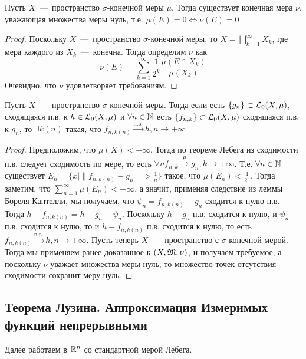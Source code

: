 \begin{lemma}
    Пусть $X$~---~пространство $\sigma$-конечной меры $\mu$. Тогда существует конечная мера $\nu$, уважающая множества меры нуль, т.е. $\mu(E) = 0 \Longleftrightarrow \nu(E) = 0$
\end{lemma}
\begin{proof}
    Поскольку $X$~---~пространство $\sigma$-конечной меры, то $X = \bigsqcup\limits_{k = 1}^\infty X_k$, где мера каждого из $X_k$~---~конечна. Тогда определим $\nu$ как \[\nu(E) = \sum\limits_{k = 1}^\infty \frac{1}{2^k} \frac{\mu(E \cap X_k)}{\mu(X_k)}\]
    Очевидно, что $\nu$ удовлетворяет требованиям.
\end{proof}

\begin{theorem}
    Пусть $X$~---~пространство $\sigma$-конечной меры. Тогда если есть $\{g_n\} \subset \mathcal{L}_0(X, \mu)$, сходящаяся п.в. к $h \in \mathcal{L}_0(X, \mu)$ и $\forall n \in \mathbb{N}$ есть $\{f_{n,k}\} \subset \mathcal{L}_0(X, \mu)$ сходящаяся п.в. к $g_n$, то $\exists k(n)$ такая, что $f_{n, k(n)} \xrightarrow{\text{п.в.}} h, n \rightarrow +\infty$
\end{theorem}
\begin{proof}
    Предположим, что $\mu(X) < +\infty$. Тогда по теореме Лебега из сходимости п.в. следует сходимость по мере, то есть $\forall n f_{n, k} \xrightarrow{\mu} g_n, k \rightarrow +\infty$. Т.е. $\forall n \in \mathbb{N}$ существует $E_n = \{x \mid \|f_{n, k(n)} - g_n\| > \frac{1}{n}\}$ такое, что $\mu(E_n) < \frac{1}{2^n}$. Тогда заметим, что $\sum\limits_{n = 1}^\infty \mu(E_n) < +\infty$, а значит, применяя следствие из леммы Бореля-Кантелли, мы получаем, что $\psi_n = f_{n, k(n)} - g_n$ сходится к нулю п.в. Тогда $h - f_{n, k(n)} = h - g_n - \psi_n$. Поскольку $h - g_n$  п.в. сходится к нулю, и $\psi_n$ п.в. сходится к нулю, то и $h - f_{n, k(n)}$ п.в. сходится к нулю, то есть $f_{n, k(n)} \xrightarrow{\text{п.в.}} h, n \rightarrow +\infty$.
    Пусть теперь $X$~---~пространство с $\sigma$-конечной мерой. Тогда мы применяем ранее доказанное к $(X, \mathfrak{M}, \nu)$, и получаем требуемое; а поскольку $\nu$ уважает множества меры нуль, то множество точек отсутствия сходимости сохранит меру нуль.
\end{proof}

\subsection{Теорема Лузина. Аппроксимация Измеримых функций непрерывными}
\begin{note}
    Далее работаем в $\mathbb{R}^n$ со стандартной мерой Лебега.
\end{note}

